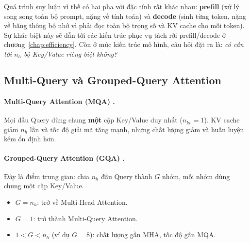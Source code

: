 Quá trình suy luận vì thế có hai pha với đặc tính rất khác nhau: \textbf{prefill} (xử lý song song toàn bộ prompt, nặng về tính toán) và \textbf{decode} (sinh từng token, nặng về băng thông bộ nhớ vì phải đọc toàn bộ trọng số và KV cache cho mỗi token). Sự khác biệt này sẽ dẫn tới các kiến trúc phục vụ tách rời prefill/decode ở chương~\ref{chap:efficiency}. Còn ở mức kiến trúc mô hình, câu hỏi đặt ra là: \emph{có cần tới $n_h$ bộ Key/Value riêng biệt không?}

\subsection{Multi-Query và Grouped-Query Attention}
\label{ssec:mqa_gqa}

\paragraph{Multi-Query Attention (MQA) \cite{shazeer2019fast}.} Mọi đầu Query dùng chung \textbf{một} cặp Key/Value duy nhất ($n_{kv} = 1$). KV cache giảm $n_h$ lần và tốc độ giải mã tăng mạnh, nhưng chất lượng giảm và huấn luyện kém ổn định hơn.

\paragraph{Grouped-Query Attention (GQA) \cite{ainslie2023gqa}.} Đây là điểm trung gian: chia $n_h$ đầu Query thành $G$ nhóm, mỗi nhóm dùng chung một cặp Key/Value.
\begin{itemize}
	\item $G = n_h$: trở về Multi-Head Attention.
	\item $G = 1$: trở thành Multi-Query Attention.
	\item $1 < G < n_h$ (ví dụ $G = 8$): chất lượng gần MHA, tốc độ gần MQA.
\end{itemize}

\begin{center}
\label{fig:mha_gqa_mqa}
\end{center}

